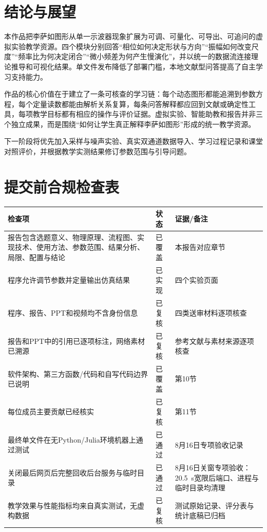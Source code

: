 \documentclass[UTF8,a4paper,zihao=-4]{ctexart}
\renewcommand{\arraystretch}{1.25}
\begin{document}
\section{结论与展望}
本作品把李萨如图形从单一示波器现象扩展为可调、可量化、可导出、可追问的虚拟实验教学资源。四个模块分别回答“相位如何决定形状与方向”“振幅如何改变尺度”“频率比为何决定闭合”“微小频差为何产生慢演化”，并以统一的数据流连接理论推导和可视化结果。单文件发布降低了部署门槛，本地文献型问答提高了自主学习支持能力。

作品的核心价值在于建立了一条可核查的学习链：每个动态图形都能追溯到参数方程，每个定量读数都能由解析关系复算，每条问答解释都应回到文献或确定性工具，每项教学目标都有相应的操作与评价证据。虚拟实验、智能助教和报告并非三个独立成果，而是围绕“如何让学生真正解释李萨如图形”形成的统一教学资源。

下一阶段将优先加入采样与噪声实验、真实双通道数据导入、学习过程记录和课堂对照评价，并根据教学实测结果修订参数范围与引导问题。




\appendix
\section{提交前合规检查表}
{\footnotesize
\renewcommand{\arraystretch}{1.0}
\begin{longtable}{p{8.2cm}>{\centering\arraybackslash}p{1.7cm}>{\raggedright\arraybackslash}p{4.1cm}}
\toprule
检查项 & 状态 & 证据/备注\\
\midrule
报告包含选题意义、物理原理、流程图、实现技术、使用方法、参数范围、结果分析、局限、配置与结论 & 已覆盖 & 本报告对应章节\\
程序允许调节参数并定量输出仿真结果 & 已实现 & 四个实验页面\\
程序、报告、PPT和视频均不含身份信息 & 已复核 & 四类送审材料逐项核查\\
报告和PPT中的引用已逐项标注，网络素材已溯源 & 已复核 & 参考文献与素材来源逐项核查\\
软件架构、第三方函数/代码和自写代码边界已说明 & 已覆盖 & 第10节\\
每位成员主要贡献已经核实 & 已复核 & 第11节\\
最终单文件在无Python/Julia环境机器上通过测试 & 已通过 & 8月16日专项验收记录\\
关闭最后网页后完整回收后台服务与临时目录 & 已通过 & 8月16日关窗专项验收：20.5~s宽限后端口、进程与临时目录均清理\\
教学效果与性能指标均来自真实测试，无虚构数据 & 已复核 & 测试原始记录、评分表与统计底稿已归档\\
\bottomrule
\end{longtable}
}
\end{document}
